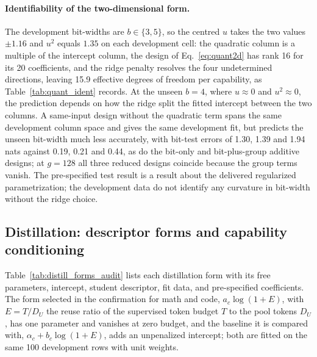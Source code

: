 \paragraph{Identifiability of the two-dimensional form.} The
development bit-widths are $b\in\{3,5\}$, so the centred $u$ takes the
two values $\pm1.16$ and $u^2$ equals $1.35$ on each development
cell: the quadratic column is a multiple of the intercept column, the
design of Eq.~\ref{eq:quant2d} has rank 16 for its 20 coefficients,
and the ridge penalty resolves the four undetermined directions, leaving 15.9 effective degrees of freedom per capability, as Table~\ref{tab:quant_ident} records. At the unseen $b=4$, where $u\approx0$
and $u^2\approx0$, the prediction depends on how the ridge split the
fitted intercept between the two columns. A same-input design without
the quadratic term spans the same development column space and gives
the same development fit, but predicts the unseen bit-width much less accurately, with bit-test errors of 1.30, 1.39 and 1.94 nats against 0.19, 0.21 and 0.44, as do
the bit-only and bit-plus-group additive designs; at $g=128$ all three
reduced designs coincide because the group terms vanish. The pre-specified
test result is a result about the delivered regularized
parametrization; the development data do not identify any curvature in bit-width without the ridge choice.



\subsection{Distillation: descriptor forms and capability conditioning}


Table~\ref{tab:distill_forms_audit} lists each distillation form with
its free parameters, intercept, student descriptor, fit data, and
pre-specified coefficients. The form selected in the confirmation for math and code,
$a_c\log(1+E)$, with $E=T/D_U$ the reuse ratio of the supervised token budget $T$ to the pool
tokens $D_U$, has one parameter and vanishes at zero budget, and the baseline it is compared with,
$\alpha_c+b_c\log(1+E)$, adds an unpenalized intercept; both are fitted on the same 100 development rows with unit
weights.


